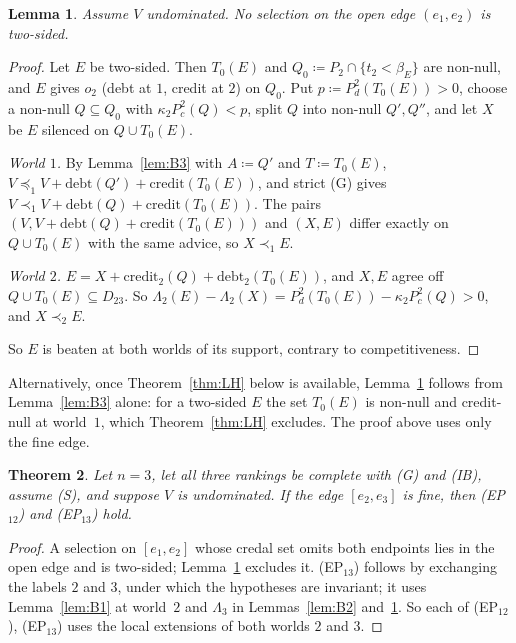 \documentclass[11pt]{article}
\newtheorem{theorem}{Theorem}
\newtheorem{lemma}[theorem]{Lemma}
\theoremstyle{definition}\newtheorem{definition}[theorem]{Definition}
\theoremstyle{remark}\newtheorem{remark}[theorem]{Remark}
\newcommand{\debt}{\mathrm{debt}}
\newcommand{\cred}{\mathrm{credit}}
\begin{document}
\begin{lemma}\label{lem:B4}
Assume $V$ undominated. No selection on the open edge $(e_1,e_2)$ is
two-sided.
\end{lemma}
\begin{proof}
Let $E$ be two-sided. Then $T_0(E)$ and $Q_0\coloneqq P_2\cap\{t_2<\beta_E\}$
are non-null, and $E$ gives $o_2$ (debt at $1$, credit at $2$) on $Q_0$. Put
$p\coloneqq P^2_d(T_0(E))>0$, choose a non-null $Q\subseteq Q_0$ with
$\kappa_2P^2_c(Q)<p$, split $Q$ into non-null $Q',Q''$, and let $X$ be $E$
silenced on $Q\cup T_0(E)$.

\emph{World $1$.} By Lemma~\ref{lem:B3} with $A\coloneqq Q'$ and
$T\coloneqq T_0(E)$, $V\preceq_1V+\debt(Q')+\cred(T_0(E))$, and strict (G)
gives $V\prec_1V+\debt(Q)+\cred(T_0(E))$. The pairs
$(V,V+\debt(Q)+\cred(T_0(E)))$ and $(X,E)$ differ exactly on $Q\cup T_0(E)$
with the same advice, so $X\prec_1E$.

\emph{World $2$.} $E=X+\cred_2(Q)+\debt_2(T_0(E))$, and $X,E$ agree off
$Q\cup T_0(E)\subseteq D_{23}$. So $\Lambda_2(E)-\Lambda_2(X)=
P^2_d(T_0(E))-\kappa_2P^2_c(Q)>0$, and $X\prec_2E$.

So $E$ is beaten at both worlds of its support, contrary to
competitiveness.
\end{proof}

Alternatively, once Theorem~\ref{thm:LH} below is available,
Lemma~\ref{lem:B4} follows from Lemma~\ref{lem:B3} alone: for a two-sided $E$
the set $T_0(E)$ is non-null and credit-null at world~$1$, which
Theorem~\ref{thm:LH} excludes. The proof above uses only the fine edge.

\begin{theorem}\label{thm:fineedge}
Let $n=3$, let all three rankings be complete with (G) and (IB), assume (S),
and suppose $V$ is undominated. If the edge $[e_2,e_3]$ is fine, then
(EP$_{12}$) and (EP$_{13}$) hold.
\end{theorem}
\begin{proof}
A selection on $[e_1,e_2]$ whose credal set omits both endpoints lies in the
open edge and is two-sided; Lemma~\ref{lem:B4} excludes it. (EP$_{13}$)
follows by exchanging the labels $2$ and $3$, under which the hypotheses are
invariant; it uses Lemma~\ref{lem:B1} at world~$2$ and $\Lambda_3$ in
Lemmas~\ref{lem:B2} and~\ref{lem:B4}. So each of (EP$_{12}$), (EP$_{13}$)
uses the local extensions of both worlds $2$ and $3$.
\end{proof}
\end{document}
